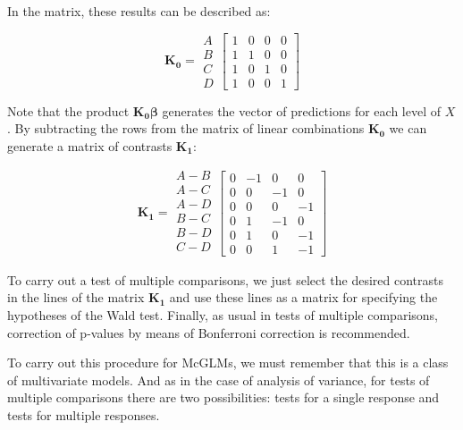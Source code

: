 \documentclass[article]{jss}\usepackage[]{graphicx}\usepackage[]{xcolor}
\begin{document}
In the matrix, these results can be described as:

$$
    \boldsymbol{K_0} = 
      \begin{matrix}
        A\\ 
        B\\ 
        C\\ 
        D 
      \end{matrix} 
    \begin{bmatrix}
      1 & 0 & 0 & 0\\ 
      1 & 1 & 0 & 0\\ 
      1 & 0 & 1 & 0\\ 
      1 & 0 & 0 & 1 
    \end{bmatrix}
$$

Note that the product $\boldsymbol{K_0} \boldsymbol{\beta}$ generates the vector of predictions for each level of $X$. By subtracting the rows from the matrix of linear combinations $\boldsymbol{K_0}$ we can generate a matrix of contrasts $\boldsymbol{K_1}$:

$$
    \boldsymbol{K_1} = 
      \begin{matrix}
        A-B\\ 
        A-C\\ 
        A-D\\ 
        B-C\\
        B-D\\
        C-D\\ 
      \end{matrix} 
    \begin{bmatrix}
      0 & -1 &  0 &  0\\ 
      0 &  0 & -1 &  0\\ 
      0 &  0 &  0 & -1\\ 
      0 &  1 & -1 &  0\\ 
      0 &  1 &  0 & -1\\ 
      0 &  0 &  1 & -1 
    \end{bmatrix}
$$

To carry out a test of multiple comparisons, we just select the desired contrasts in the lines of the matrix $\boldsymbol{K_1}$ and use these lines as a matrix for specifying the hypotheses of the Wald test. Finally, as usual in tests of multiple comparisons, correction of p-values by means of Bonferroni correction is recommended.

To carry out this procedure for McGLMs, we must remember that this is a class of multivariate models. And as in the case of analysis of variance, for tests of multiple comparisons there are two possibilities: tests for a single response and tests for multiple responses.
\end{document}
